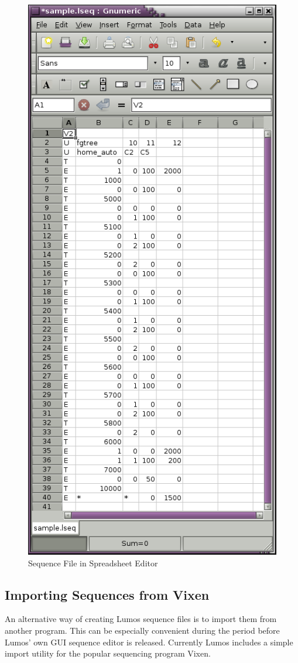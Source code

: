 \documentclass{article}
\begin{document}
\begin{figure}[p]
\includegraphics{seq-ss}
\caption{Sequence File in Spreadsheet Editor}
\label{seq:ss}
\end{figure}

\subsection{Importing Sequences from Vixen}
An alternative way of creating Lumos sequence files is to import them from
another program.  This can be especially convenient during the period before
Lumos' own GUI sequence editor is released.  Currently Lumos includes a simple 
import utility for the popular sequencing program Vixen.  
\end{document}
